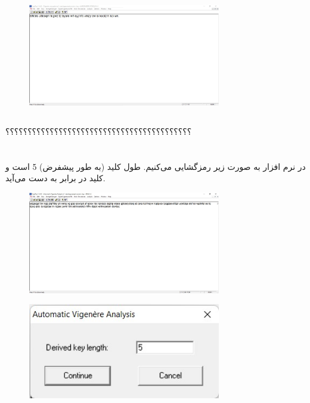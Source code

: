 \documentclass{article}
\begin{document}
\begin{figure}[H]
    \centering
    \includegraphics[width=0.75\textwidth]{figures/3bc.jpg}
    \caption
	{}
    \label{fig:fig1}
\end{figure}

\subsection{}
؟؟؟؟؟؟؟؟؟؟؟؟؟؟؟؟؟؟؟؟؟؟؟؟؟؟؟؟؟؟؟؟؟؟؟؟؟؟؟؟؟؟




\section{}%
در نرم افزار  به صورت زیر رمزگشایی می‌کنیم. طول کلید (به طور پیشفرض) 5 است و کلید در  برابر  به دست می‌آید.
\begin{figure}[H]
    \centering
    \includegraphics[width=0.75\textwidth]{figures/4a.jpg}
    \caption
	{}
    \label{fig:fig1}
\end{figure}

\begin{figure}[H]
    \centering
    \includegraphics[width=0.75\textwidth]{figures/4b.jpg}
    \caption
	{}
    \label{fig:fig1}
\end{figure}
\end{document}
